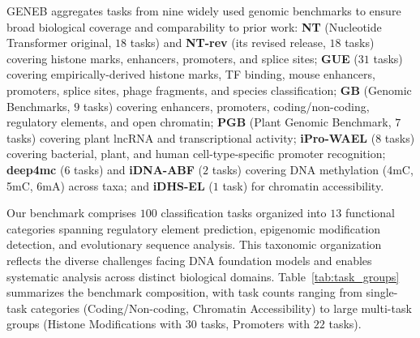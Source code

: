 \documentclass{article}
\theoremstyle{plain}
\theoremstyle{definition}
\theoremstyle{remark}
\begin{document}
GENEB aggregates tasks from nine widely used genomic benchmarks
to ensure broad biological coverage and comparability to prior
work: \textbf{NT} (Nucleotide Transformer original, $18$ tasks)
and \textbf{NT-rev} (its revised release, $18$ tasks) covering
histone marks, enhancers, promoters, and splice sites;
\textbf{GUE} ($31$ tasks) covering empirically-derived histone
marks, TF binding, mouse enhancers, promoters, splice sites,
phage fragments, and species classification; \textbf{GB}
(Genomic Benchmarks, $9$ tasks) covering enhancers, promoters,
coding/non-coding, regulatory elements, and open chromatin;
\textbf{PGB} (Plant Genomic Benchmark, $7$ tasks) covering plant
lncRNA and transcriptional activity; \textbf{iPro-WAEL}
($8$ tasks) covering bacterial, plant, and human
cell-type-specific promoter recognition; \textbf{deep4mc}
($6$ tasks) and \textbf{iDNA-ABF} ($2$ tasks) covering DNA
methylation (4mC, 5mC, 6mA) across taxa; and \textbf{iDHS-EL}
($1$ task) for chromatin accessibility.

Our benchmark comprises $100$ classification tasks organized
into $13$ functional categories spanning regulatory element
prediction, epigenomic modification detection, and evolutionary
sequence analysis. This taxonomic organization reflects the
diverse challenges facing DNA foundation models and enables
systematic analysis across distinct biological domains.
Table~\ref{tab:task_groups} summarizes the benchmark composition,
with task counts ranging from single-task categories
(Coding/Non-coding, Chromatin Accessibility) to large multi-task
groups (Histone Modifications with $30$ tasks, Promoters with
$22$ tasks).
\end{document}
